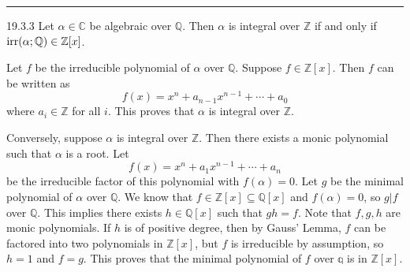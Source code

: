 \documentclass[letterpaper, 12pt]{article}
\begin{document}
\noindent\rule{7in}{2.8pt}
\begin{problem}{19.3.3}
Let \(\alpha \in \mathbb{C}\) be algebraic over \(\mathbb{Q}\). Then \(\alpha\) is integral over \(\mathbb{Z}\) if and only if \(\text{irr}(\alpha;\mathbb{Q})\in \mathbb{Z}[x]\).
\end{problem}
\begin{solution}
Let \(f\) be the irreducible polynomial of \(\alpha\) over \(\mathbb{Q}\). Suppose \(f\in \mathbb{Z}[x]\). Then \(f\) can be written as 
\[f(x)=x^n+a_{n-1}x^{n-1}+\cdots+a_0\]
where \(a_i\in \mathbb{Z}\) for all \(i\). This proves that \(\alpha\) is integral over \(\mathbb{Z}\). 

Conversely, suppose \(\alpha\) is integral over \(\mathbb{Z}\). Then there exists a monic polynomial 
such that \(\alpha\) is a root. Let 
\[f(x)=x^n+a_1x^{n-1}+\cdots+a_n\] 
be the irreducible factor of this polynomial with \(f(\alpha)=0\). Let \(g\) be the minimal polynomial of \(\alpha\) over \(\mathbb{Q}\). We know that \(f\in \mathbb{Z}[x]\subseteq \mathbb{Q}[x]\) and \(f(\alpha)=0\), so \(g|f\) over \(\mathbb{Q}\). This implies there exists \(h\in \mathbb{Q}[x]\) such that \(gh=f\). Note that \(f,g,h\) are monic polynomials. If \(h\) is of positive degree, then by Gauss' Lemma, \(f\) can be factored into two polynomials in \(\mathbb{Z}[x]\), but \(f\) is irreducible by assumption, so \(h=1\) and \(f=g\). This proves that the minimal polynomial of \(f\) over \(\mathbb{q}\) is in \(\mathbb{Z}[x]\).
\end{solution}
\end{document}
